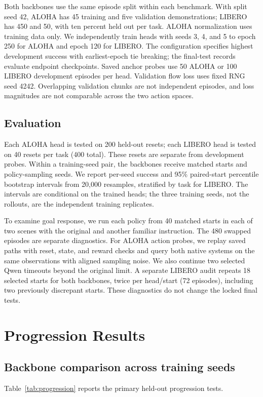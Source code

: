 \documentclass[conference]{IEEEtran}
\begin{document}
Both backbones use the same episode split within each benchmark. With split
seed 42, ALOHA has 45 training and five validation demonstrations; LIBERO has
450 and 50, with ten percent held out per task. ALOHA normalization uses
training data only. We independently train heads with seeds 3, 4, and 5 to
epoch 250 for ALOHA and epoch 120 for LIBERO. The configuration specifies
highest development success with earliest-epoch tie breaking; the final-test
records evaluate endpoint checkpoints. Saved anchor probes use 50 ALOHA or
100 LIBERO development episodes per head. Validation flow loss uses fixed
RNG seed 4242. Overlapping validation chunks are not independent episodes,
and loss magnitudes are not comparable across the two action spaces.

\subsection{Evaluation}
Each ALOHA head is tested on 200 held-out resets; each LIBERO head is tested
on 40 resets per task (400 total). These resets are separate from development
probes. Within a training-seed pair, the backbones receive matched starts and
policy-sampling seeds. We report per-seed success and 95\% paired-start
percentile bootstrap intervals from 20,000 resamples, stratified by task for
LIBERO. The intervals are conditional on the trained heads; the three training
seeds, not the rollouts, are the independent training replicates.

To examine goal response, we run each policy from 40 matched starts in each
of two scenes with the original and another familiar instruction. The 480
swapped episodes are separate diagnostics. For ALOHA action probes, we replay
saved paths with reset, state, and reward checks and query both native systems
on the same observations with aligned sampling noise. We also continue two
selected Qwen timeouts beyond the original limit. A separate LIBERO audit
repeats 18 selected starts for both backbones, twice per head/start (72
episodes), including two previously discrepant starts. These diagnostics do
not change the locked final tests.

\section{Progression Results}
\subsection{Backbone comparison across training seeds}
Table~\ref{tab:progression} reports the primary held-out progression tests.
\end{document}
